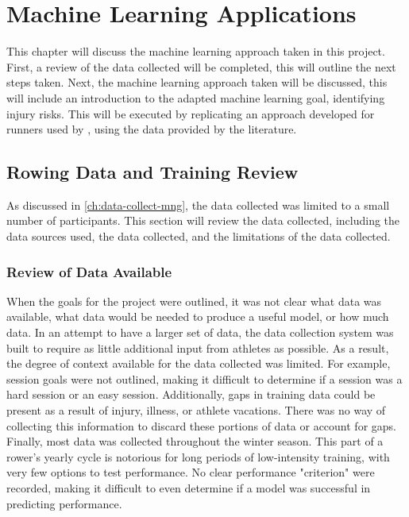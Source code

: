 \chapter{\label{ch:ml}Machine Learning Applications}
This chapter will discuss the machine learning approach taken in this project. First, a review of the data collected will be completed, this will outline the next steps taken. Next, the machine learning approach taken will be discussed, this will include an introduction to the adapted machine learning goal, identifying injury risks. This will be executed by replicating an approach developed for runners used by \textcite{Lovdal2021}, using the data provided by the literature.

\section{Rowing Data and Training Review}
As discussed in \autoref{ch:data-collect-mng}, the data collected was limited to a small number of participants. This section will review the data collected, including the data sources used, the data collected, and the limitations of the data collected.
\subsection{Review of Data Available}
When the goals for the project were outlined, it was not clear what data was available, what data would be needed to produce a useful model, or how much data. In an attempt to have a larger set of data, the data collection system was built to require as little additional input from athletes as possible. As a result, the degree of context available for the data collected was limited. For example, session goals were not outlined, making it difficult to determine if a session was a hard session or an easy session. Additionally, gaps in training data could be present as a result of injury, illness, or athlete vacations. There was no way of collecting this information to discard these portions of data or account for gaps. Finally, most data was collected throughout the winter season. This part of a rower's yearly cycle is notorious for long periods of low-intensity training, with very few options to test performance. No clear performance "criterion" were recorded, making it difficult to even determine if a model was successful in predicting performance.

